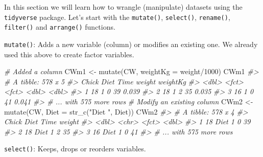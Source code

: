 \documentclass[
  14pt,
]{memoir}
\newenvironment{Shaded}{\begin{snugshade}}{\end{snugshade}}
\newcommand{\AttributeTok}[1]{\textcolor[rgb]{0.77,0.63,0.00}{#1}}
\newcommand{\CommentTok}[1]{\textcolor[rgb]{0.56,0.35,0.01}{\textit{#1}}}
\newcommand{\DecValTok}[1]{\textcolor[rgb]{0.00,0.00,0.81}{#1}}
\newcommand{\FunctionTok}[1]{\textcolor[rgb]{0.00,0.00,0.00}{#1}}
\newcommand{\NormalTok}[1]{#1}
\newcommand{\OtherTok}[1]{\textcolor[rgb]{0.56,0.35,0.01}{#1}}
\newcommand{\SpecialCharTok}[1]{\textcolor[rgb]{0.00,0.00,0.00}{#1}}
\newcommand{\StringTok}[1]{\textcolor[rgb]{0.31,0.60,0.02}{#1}}
\begin{document}
In this section we will learn how to wrangle (manipulate) datasets using the \texttt{tidyverse}
package. Let's start with the \texttt{mutate()}, \texttt{select()}, \texttt{rename()}, \texttt{filter()} and \texttt{arrange()}
functions.

\hfill\break

\texttt{mutate()}: Adds a new variable (column) or modifies an existing one. We already used this above to create
factor variables.

\begin{Shaded}
\begin{Highlighting}[]
\CommentTok{\# Added a column}
\NormalTok{CWm1 }\OtherTok{\textless{}{-}} \FunctionTok{mutate}\NormalTok{(CW, }\AttributeTok{weightKg =}\NormalTok{ weight}\SpecialCharTok{/}\DecValTok{1000}\NormalTok{)}
\NormalTok{CWm1}
\CommentTok{\#\textgreater{} \# A tibble: 578 x 5}
\CommentTok{\#\textgreater{}   Chick Diet  Time  weight weightKg}
\CommentTok{\#\textgreater{}   \textless{}dbl\textgreater{} \textless{}fct\textgreater{} \textless{}fct\textgreater{}  \textless{}dbl\textgreater{}    \textless{}dbl\textgreater{}}
\CommentTok{\#\textgreater{} 1    18 1     0         39    0.039}
\CommentTok{\#\textgreater{} 2    18 1     2         35    0.035}
\CommentTok{\#\textgreater{} 3    16 1     0         41    0.041}
\CommentTok{\#\textgreater{} \# ... with 575 more rows}
\CommentTok{\# Modify an existing column}
\NormalTok{CWm2 }\OtherTok{\textless{}{-}} \FunctionTok{mutate}\NormalTok{(CW, }\AttributeTok{Diet =} \FunctionTok{str\_c}\NormalTok{(}\StringTok{"Diet "}\NormalTok{, Diet))}
\NormalTok{CWm2}
\CommentTok{\#\textgreater{} \# A tibble: 578 x 4}
\CommentTok{\#\textgreater{}   Chick Diet   Time  weight}
\CommentTok{\#\textgreater{}   \textless{}dbl\textgreater{} \textless{}chr\textgreater{}  \textless{}fct\textgreater{}  \textless{}dbl\textgreater{}}
\CommentTok{\#\textgreater{} 1    18 Diet 1 0         39}
\CommentTok{\#\textgreater{} 2    18 Diet 1 2         35}
\CommentTok{\#\textgreater{} 3    16 Diet 1 0         41}
\CommentTok{\#\textgreater{} \# ... with 575 more rows}
\end{Highlighting}
\end{Shaded}

\hfill\break

\texttt{select()}: Keeps, drops or reorders variables.
\end{document}
